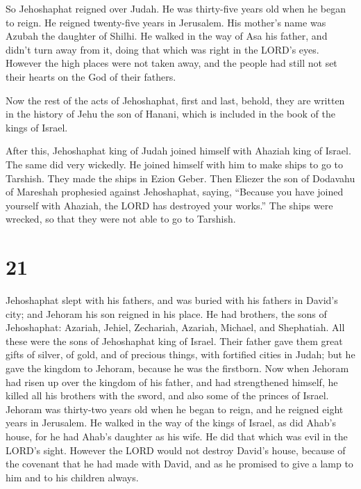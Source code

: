 So Jehoshaphat reigned over Judah. He was thirty-five
years old when he began to reign. He reigned twenty-five years in
Jerusalem. His mother's name was Azubah the daughter of Shilhi.
 He walked in the way of Asa his father, and didn't turn
away from it, doing that which was right in the LORD's eyes.
 However the high places were not taken away, and the
people had still not set their hearts on the God of their fathers.

 Now the rest of the acts of Jehoshaphat, first and last,
behold, they are written in the history of Jehu the son of Hanani, which
is included in the book of the kings of Israel.

 After this, Jehoshaphat king of Judah joined himself with
Ahaziah king of Israel. The same did very wickedly.  He
joined himself with him to make ships to go to Tarshish. They made the
ships in Ezion Geber.  Then Eliezer the son of Dodavahu of
Mareshah prophesied against Jehoshaphat, saying, ``Because you have
joined yourself with Ahaziah, the LORD has destroyed your works.'' The
ships were wrecked, so that they were not able to go to Tarshish.

\hypertarget{section-20}{%
\section{21}\label{section-20}}

 Jehoshaphat slept with his fathers, and was buried with his
fathers in David's city; and Jehoram his son reigned in his place.
 He had brothers, the sons of Jehoshaphat: Azariah, Jehiel,
Zechariah, Azariah, Michael, and Shephatiah. All these were the sons of
Jehoshaphat king of Israel.  Their father gave them great
gifts of silver, of gold, and of precious things, with fortified cities
in Judah; but he gave the kingdom to Jehoram, because he was the
firstborn.  Now when Jehoram had risen up over the kingdom
of his father, and had strengthened himself, he killed all his brothers
with the sword, and also some of the princes of Israel. 
Jehoram was thirty-two years old when he began to reign, and he reigned
eight years in Jerusalem.  He walked in the way of the kings
of Israel, as did Ahab's house, for he had Ahab's daughter as his wife.
He did that which was evil in the LORD's sight.  However the
LORD would not destroy David's house, because of the covenant that he
had made with David, and as he promised to give a lamp to him and to his
children always.

